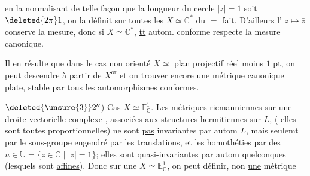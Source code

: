 
en la normalisant  de telle façon que la longueur du cercle $|z|=1$ soit $\deleted{2\pi}1$,  on la définit sur toutes les $X\simeq\mathbb C^*$ du $=$ fait. D'ailleurs l' $z\mapsto\bar z$  conserve la mesure, donc si $X\simeq\mathbb C^*$, \uline{tt} autom. conforme respecte la mesure canonique.

Il en résulte que dans le cas non orienté $X\simeq$ plan projectif réel moins $1$ pt, on peut descendre à partir de $X^{\mathrm{or}}$ et on trouver encore une métrique canonique plate, stable par tous les automorphismes conformes.

$\deleted{\unsure{3}}2''$) Cas $X\simeq\mathbb E^1_{\mathbb C}$. Les métriques riemanniennes sur une  droite vectorielle  complexe , associées aux structures hermitiennes  sur $L$, ( elles sont toutes proportionnelles) ne sont \uline{pas} invariantes par autom  $L$, mais seulemt par le sous-groupe engendré par les translations, et les  homothéties par des $u\in\mathbb U=\{z\in\mathbb C\mid |z|=1\}$; elles sont quasi-invariantes par autom quelconques (lesquels sont \uline{affines}). Donc sur une $X\simeq\mathbb E^1_{\mathbb C}$, on peut définir, non \uline{une} métrique
